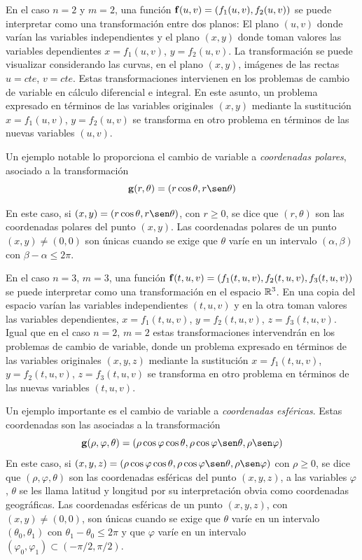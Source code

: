 En el caso $n=2$ y $m=2$, una función $\mathbf{f}(u,v)=(f_1(u,v),f_2(u,v))$ se puede interpretar como una transformación entre dos planos: El plano $(u,v)$ donde varían las variables independientes y el plano $(x,y)$ donde toman valores las variables dependientes $x=f_1(u,v)$, $y=f_2(u,v)$. La transformación se puede visualizar considerando las curvas, en el plano $(x,y)$, imágenes de las rectas $u=cte$, $v=cte$. Estas transformaciones intervienen en los problemas de cambio de variable en cálculo diferencial e integral. En este asunto, un problema expresado en términos de las variables originales $(x,y)$ mediante la sustitución $x=f_1(u,v)$, $y=f_2(u,v)$ se transforma en otro problema en términos de las nuevas variables $(u,v)$.

Un ejemplo notable lo proporciona el cambio de variable a {\it coordenadas polares}, asociado a la transformación
$$\g(r,\theta)=(r\cos\theta, r\sen\theta)$$

En este caso, si $(x,y)=(r\cos\theta, r\sen\theta)$, con $r\geq 0$, se dice que $(r,\theta)$ son las coordenadas polares del punto $(x,y)$. Las coordenadas polares de un punto $(x,y)\neq (0,0)$ son únicas cuando se exige que $\theta$ varíe en un intervalo $(\alpha,\beta)$ con $\beta - \alpha\leq 2\pi$.

En el caso $n=3$, $m=3$, una función $\mathbf{f}(t,u,v)=(f_1(t,u,v),f_2(t,u,v),f_3(t,u,v))$ se puede interpretar como una transformación en el espacio $\mathbb{R}^3$. En una copia del espacio varían las variables independientes $(t,u,v)$ y en la otra toman valores las variables dependientes, $x=f_1(t,u,v)$, $y=f_2(t,u,v)$, $z=f_3(t,u,v)$. Igual que en el caso $n=2$, $m=2$ estas transformaciones intervendrán en los problemas de cambio de variable, donde un problema expresado en términos de las variables originales $(x,y,z)$ mediante la sustitución $x=f_1(t,u,v)$, $y=f_2(t,u,v)$, $z=f_3(t,u,v)$ se transforma en otro problema en términos de las nuevas variables $(t,u,v)$.

Un ejemplo importante es el cambio de variable a {\it coordenadas esféricas}. Estas coordenadas son las asociadas a la transformación
$$\g(\rho,\varphi,\theta)=(\rho\cos\varphi\cos\theta,\rho\cos\varphi\sen\theta, \rho\sen\varphi)$$
En este caso, si $(x,y,z)=(\rho\cos\varphi\cos\theta,\rho\cos\varphi\sen\theta, \rho\sen\varphi)$ con $\rho\geq 0$, se dice que $(\rho,\varphi,\theta)$ son las coordenadas esféricas del punto $(x,y,z)$, a las variables $\varphi$, $\theta$ se les llama latitud y longitud por su interpretación obvia como coordenadas geográficas. Las coordenadas esféricas de un punto $(x,y,z)$, con $(x,y)\neq (0,0)$, son únicas cuando se exige que $\theta$ varíe en un intervalo $(\theta_0,\theta_1)$ con $\theta_1-\theta_0\leq 2\pi$ y que $\varphi$ varíe en un intervalo $(\varphi_0,\varphi_1)\subset(-\pi/2, \pi/2)$.

